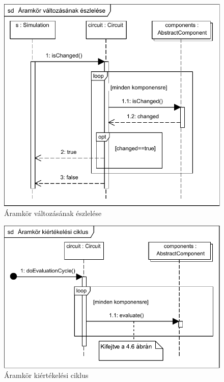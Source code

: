 
\begin{figure}[H]
\begin{center}
\includegraphics{chapters/chapter04/seqdiagrams/is_changed.pdf}
\caption{Áramkör változásának észlelése}
\label{fig:is_changed}
\end{center}
\end{figure}

\begin{figure}[H]
\begin{center}
\includegraphics{chapters/chapter04/seqdiagrams/new/doEvalCycle.pdf}
\caption{Áramkör kiértékelési ciklus}
\label{fig:circuit_sim}
\end{center}
\end{figure}

